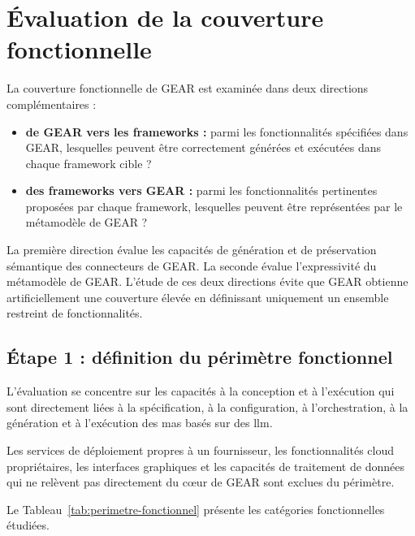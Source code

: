 \section{Évaluation de la couverture fonctionnelle}
\label{sec:couverture-fonctionnelle}

La couverture fonctionnelle de GEAR est examinée dans deux directions
complémentaires :

\begin{itemize}
    \item \textbf{de GEAR vers les frameworks :} parmi les
    fonctionnalités spécifiées dans GEAR, lesquelles peuvent être
    correctement générées et exécutées dans chaque framework cible ?

    \item \textbf{des frameworks vers GEAR :} parmi les fonctionnalités
    pertinentes proposées par chaque framework, lesquelles peuvent
    être représentées par le métamodèle de GEAR ?
\end{itemize}

La première direction évalue les capacités de génération et de
préservation sémantique des connecteurs de GEAR. La seconde évalue
l'expressivité du métamodèle de GEAR. L'étude de ces deux directions
évite que GEAR obtienne artificiellement une couverture élevée en
définissant uniquement un ensemble restreint de fonctionnalités.


\subsection{Étape 1 : définition du périmètre fonctionnel}
\label{subsec:perimetre-fonctionnel}

L'évaluation se concentre sur les capacités à la conception et à
l'exécution qui sont directement liées à la spécification, à la
configuration, à l'orchestration, à la génération et à l'exécution des
\gls{mas} basés sur des \gls{llm}.

Les services de déploiement propres à un fournisseur, les
fonctionnalités cloud propriétaires, les interfaces graphiques et les
capacités de traitement de données qui ne relèvent pas directement du
cœur de GEAR sont exclues du périmètre.

Le Tableau~\ref{tab:perimetre-fonctionnel} présente les catégories
fonctionnelles étudiées.

